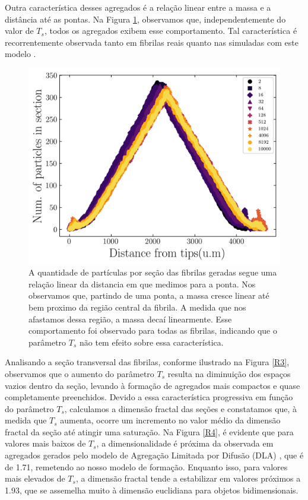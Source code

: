 \documentclass{article}
\begin{document}
    Outra característica desses agregados é a relação linear entre a massa e a distância até as pontas. Na Figura 
    \ref{R2}, observamos que, independentemente do valor de \(T_{s}\), todos os agregados exibem esse comportamento. 
    Tal característica é recorrentemente observada tanto em fibrilas reais quanto nas simuladas com este modelo 
    \cite{Parkinson1995,Kadler1987}. 


    \begin{figure}[H]
        \centering
        \includegraphics[width=\textwidth]{figures/tips.png}

        \caption{A quantidade de partículas por seção das fibrilas geradas segue uma relação linear da distancia em que 
        medimos para a ponta. Nos observamos que, partindo de uma ponta, a massa cresce linear até bem proximo da região
        central da fibrila. A medida que nos afastamos dessa região, a massa decaí linearmente. Esse comportamento foi 
        observado para todas as fibrilas, indicando que o parâmetro \(T_{s}\) não tem efeito sobre essa característica.} 

        \label{R2}
    \end{figure}


    Analisando a seção transversal das fibrilas, conforme ilustrado na Figura \ref{R3}, observamos que o aumento do 
    parâmetro \(T_{s}\) resulta na diminuição dos espaços vazios dentro da seção, levando à formação de agregados mais 
    compactos e quase completamente preenchidos. Devido a essa característica progressiva em função do parâmetro 
    \(T_{s}\), calculamos a dimensão fractal das seções e constatamos que, à medida que \(T_{s}\) aumenta, ocorre um 
    incremento no valor médio da dimensão fractal da seção até atingir uma saturação. Na Figura \ref{R4}, é evidente 
    que para valores mais baixos de \(T_{s}\), a dimensionalidade é próxima da observada em agregados gerados pelo 
    modelo de Agregação Limitada por Difusão (DLA) \cite{Witten1983}, que é de 1.71, remetendo ao nosso modelo de 
    formação. Enquanto isso, para valores mais elevados de \(T_{s}\), a dimensão fractal tende a estabilizar em valores 
    próximos a 1.93, que se assemelha muito à dimensão euclidiana para objetos bidimensionais. 
\end{document}
